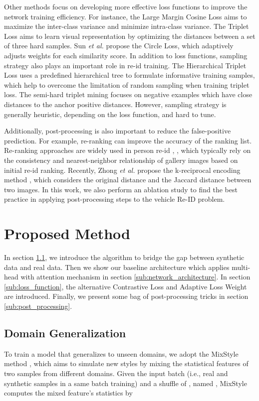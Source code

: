 \documentclass[10pt,twocolumn,letterpaper]{article}
\begin{document}
Other methods focus on developing more effective loss functions to improve the network training efficiency. For instance, the Large Margin Cosine Loss \cite{cosface} aims to maximize the inter-class variance and minimize intra-class variance. The Triplet Loss \cite{triplet} aims to learn visual representation by optimizing the distances between a set of three hard samples. Sun {\it et al.} \cite{circleloss} propose the Circle Loss, which adaptively adjusts weights for each similarity score. In addition to loss functions, sampling strategy also plays an important role in re-id training. The Hierarchical Triplet Loss \cite{HTL} uses a predefined hierarchical tree to formulate informative training samples, which help to overcome the limitation of random sampling when training triplet loss. The semi-hard triplet mining \cite{facenet} focuses on negative examples which have close distances to the anchor positive distances. However, sampling strategy is generally heuristic, depending on the loss function, and hard to tune.

Additionally, post-processing is also important to reduce the false-positive prediction. For example, re-ranking can improve the accuracy of the ranking list. Re-ranking approaches are widely used in person re-id \cite{old_reranking_1}, \cite{old_reranking_2}, which typically rely on the consistency and nearest-neighbor relationship of gallery images based on initial re-id ranking. Recently, Zhong {\it et al.} \cite{rerank} propose the k-reciprocal encoding method , which considers the original distance and the Jaccard distance between two images. In this work, we also perform an ablation study to find the best practice in applying post-processing steps to the vehicle Re-ID problem. 
\section{Proposed Method}

In section \ref{sub:domain_generalization}, we introduce the algorithm to bridge the gap between synthetic data and real data. Then we show our baseline architecture which applies multi-head with attention mechanism in section \ref{sub:network_architecture}. In section \ref{sub:loss_function}, the alternative Contrastive Loss and Adaptive Loss Weight are introduced. Finally, we present some bag of post-processing tricks in section \ref{sub:post_processing}.

\subsection{Domain Generalization} \label{sub:domain_generalization}
To train a model that generalizes to unseen domains, we adopt the MixStyle method \cite{mixstyle}, which aims to simulate new styles by mixing the statistical features of two samples from different domains. Given the input batch  (i.e.,  real and synthetic samples in a same batch training) and a shuffle of , named , MixStyle computes the mixed feature's statistics by
\end{document}
